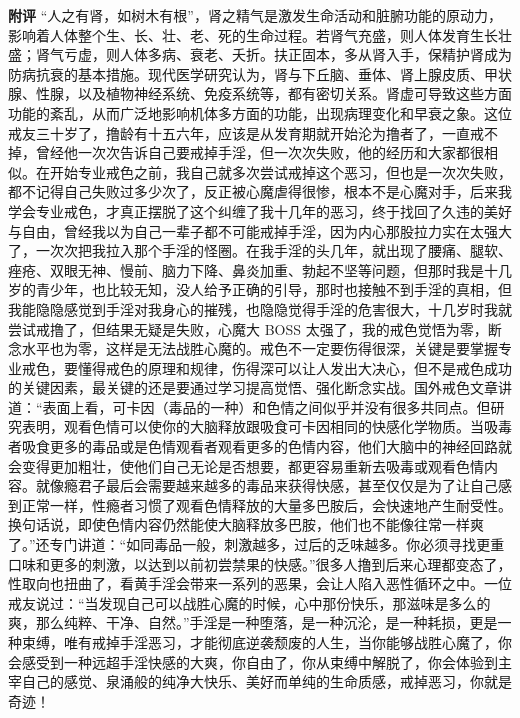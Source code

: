 \begin{case}
    \textbf{附评} “人之有肾，如树木有根”，肾之精气是激发生命活动和脏腑功能的原动力，影响着人体整个生、长、壮、老、死的生命过程。若肾气充盛，则人体发育生长壮盛；肾气亏虚，则人体多病、衰老、夭折。扶正固本，多从肾入手，保精护肾成为防病抗衰的基本措施。现代医学研究认为，肾与下丘脑、垂体、肾上腺皮质、甲状腺、性腺，以及植物神经系统、免疫系统等，都有密切关系。肾虚可导致这些方面功能的紊乱，从而广泛地影响机体多方面的功能，出现病理变化和早衰之象。这位戒友三十岁了，撸龄有十五六年，应该是从发育期就开始沦为撸者了，一直戒不掉，曾经他一次次告诉自己要戒掉手淫，但一次次失败，他的经历和大家都很相似。在开始专业戒色之前，我自己就多次尝试戒掉这个恶习，但也是一次次失败，都不记得自己失败过多少次了，反正被心魔虐得很惨，根本不是心魔对手，后来我学会专业戒色，才真正摆脱了这个纠缠了我十几年的恶习，终于找回了久违的美好与自由，曾经我以为自己一辈子都不可能戒掉手淫，因为内心那股拉力实在太强大了，一次次把我拉入那个手淫的怪圈。在我手淫的头几年，就出现了腰痛、腿软、痤疮、双眼无神、慢前、脑力下降、鼻炎加重、勃起不坚等问题，但那时我是十几岁的青少年，也比较无知，没人给予正确的引导，那时也接触不到手淫的真相，但我能隐隐感觉到手淫对我身心的摧残，也隐隐觉得手淫的危害很大，十几岁时我就尝试戒撸了，但结果无疑是失败，心魔大 BOSS 太强了，我的戒色觉悟为零，断念水平也为零，这样是无法战胜心魔的。戒色不一定要伤得很深，关键是要掌握专业戒色，要懂得戒色的原理和规律，伤得深可以让人发出大决心，但不是戒色成功的关键因素，最关键的还是要通过学习提高觉悟、强化断念实战。国外戒色文章讲道：“表面上看，可卡因（毒品的一种）和色情之间似乎并没有很多共同点。但研究表明，观看色情可以使你的大脑释放跟吸食可卡因相同的快感化学物质。当吸毒者吸食更多的毒品或是色情观看者观看更多的色情内容，他们大脑中的神经回路就会变得更加粗壮，使他们自己无论是否想要，都更容易重新去吸毒或观看色情内容。就像瘾君子最后会需要越来越多的毒品来获得快感，甚至仅仅是为了让自己感到正常一样，性瘾者习惯了观看色情释放的大量多巴胺后，会快速地产生耐受性。换句话说，即使色情内容仍然能使大脑释放多巴胺，他们也不能像往常一样爽了。”还专门讲道：“如同毒品一般，刺激越多，过后的乏味越多。你必须寻找更重口味和更多的刺激，以达到以前初尝禁果的快感。”很多人撸到后来心理都变态了，性取向也扭曲了，看黄手淫会带来一系列的恶果，会让人陷入恶性循环之中。一位戒友说过：“当发现自己可以战胜心魔的时候，心中那份快乐，那滋味是多么的爽，那么纯粹、干净、自然。”手淫是一种堕落，是一种沉沦，是一种耗损，更是一种束缚，唯有戒掉手淫恶习，才能彻底逆袭颓废的人生，当你能够战胜心魔了，你会感受到一种远超手淫快感的大爽，你自由了，你从束缚中解脱了，你会体验到主宰自己的感觉、泉涌般的纯净大快乐、美好而单纯的生命质感，戒掉恶习，你就是奇迹！
\end{case}

